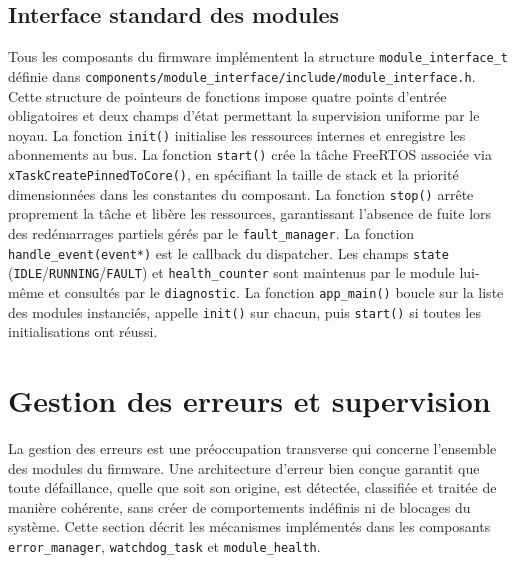 \subsection{Interface standard des modules}
\label{subsec:modiface_impl}

Tous les composants du firmware implémentent la structure
\texttt{module\_interface\_t} définie dans
\texttt{components/module\_interface/include/module\_interface.h}.
Cette structure de pointeurs de fonctions impose quatre points d'entrée
obligatoires et deux champs d'état permettant la supervision uniforme
par le noyau. La fonction \texttt{init()} initialise les ressources
internes et enregistre les abonnements au bus. La fonction
\texttt{start()} crée la tâche FreeRTOS associée via
\texttt{xTaskCreatePinnedToCore()}, en spécifiant la taille de stack
et la priorité dimensionnées dans les constantes du composant. La
fonction \texttt{stop()} arrête proprement la tâche et libère les
ressources, garantissant l'absence de fuite lors des redémarrages
partiels gérés par le \texttt{fault\_manager}. La fonction
\texttt{handle\_event(event*)} est le callback du dispatcher. Les
champs \texttt{state} (\texttt{IDLE}/\texttt{RUNNING}/\texttt{FAULT})
et \texttt{health\_counter} sont maintenus par le module lui-même
et consultés par le \texttt{diagnostic}. La fonction \texttt{app\_main()}
boucle sur la liste des modules instanciés, appelle \texttt{init()}
sur chacun, puis \texttt{start()} si toutes les initialisations ont
réussi.

\section{Gestion des erreurs et supervision}
\label{sec:errors}

La gestion des erreurs est une préoccupation transverse qui concerne
l'ensemble des modules du firmware. Une architecture d'erreur bien
conçue garantit que toute défaillance, quelle que soit son origine,
est détectée, classifiée et traitée de manière cohérente, sans créer
de comportements indéfinis ni de blocages du système. Cette section
décrit les mécanismes implémentés dans les composants
\texttt{error\_manager}, \texttt{watchdog\_task} et
\texttt{module\_health}.

